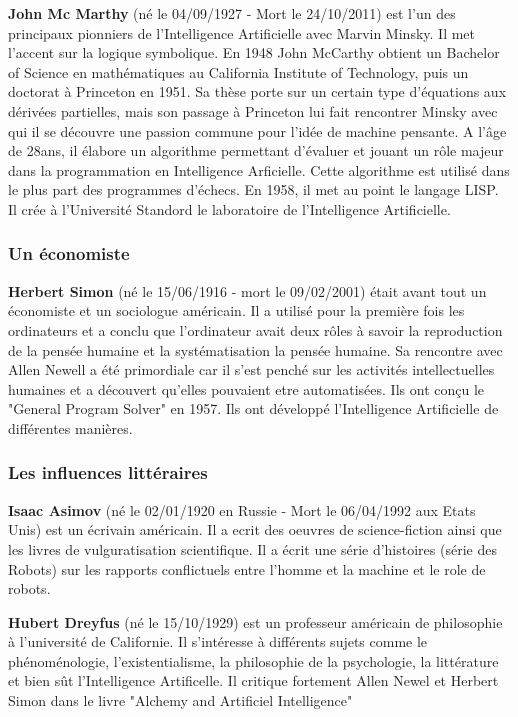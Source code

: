 \textbf{John Mc Marthy }(né le 04/09/1927 - Mort le 24/10/2011) est l'un des principaux pionniers de l'Intelligence Artificielle avec Marvin Minsky. Il met l'accent sur la logique symbolique. En 1948 John McCarthy obtient un Bachelor of Science en mathématiques au California Institute of Technology, puis un doctorat à Princeton en 1951. Sa thèse porte sur un certain type d'équations aux dérivées partielles, mais son passage à Princeton lui fait rencontrer Minsky avec qui il se découvre une passion commune pour l'idée de machine pensante. A l'âge de 28ans, il élabore un algorithme permettant d'évaluer et jouant un rôle majeur dans la programmation en Intelligence Arficielle.  Cette algorithme est utilisé dans le plus part des programmes d'échecs. En 1958, il met au point le langage LISP. Il crée à l'Université Standord le laboratoire de l'Intelligence Artificielle. 




\subsubsection{Un économiste}

\textbf{Herbert Simon} (né le 15/06/1916 - mort le 09/02/2001) était avant tout un économiste et un sociologue américain. Il a utilisé pour la première fois les ordinateurs et a conclu que l'ordinateur avait deux rôles à savoir la reproduction de la pensée humaine et la systématisation la pensée humaine. Sa rencontre avec Allen Newell a été primordiale car il s'est penché sur les activités intellectuelles humaines et a découvert qu'elles pouvaient etre automatisées. Ils ont conçu le "General Program Solver" en 1957. Ils ont développé l'Intelligence Artificielle  de différentes manières. 



\subsubsection{Les influences littéraires}


\textbf{Isaac Asimov} (né le 02/01/1920 en Russie - Mort le 06/04/1992 aux Etats Unis) est un écrivain américain. Il a ecrit des oeuvres de science-fiction ainsi que les livres de vulguratisation scientifique. Il a écrit une série d'histoires (série des Robots)  sur les rapports conflictuels entre l'homme et la machine et le role de robots.   


\textbf{Hubert Dreyfus }(né le 15/10/1929) est un professeur américain de philosophie à l'université de Californie. Il s'intéresse à différents sujets comme le phénoménologie, l'existentialisme, la philosophie de la psychologie, la littérature et bien sût l'Intelligence Artificelle. Il critique fortement Allen Newel et Herbert Simon dans le livre "Alchemy and Artificiel Intelligence"

